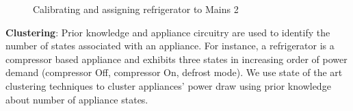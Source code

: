 \documentclass[conference]{IEEEtran}
\begin{document}
\begin{figure} 
	
     \hspace{2pt}
    \vspace{-8pt}
  	\caption{Calibrating and assigning refrigerator to Mains 2 }
  	\vspace{-20pt}
    \label{fig:assignment}
\end{figure}

\noindent\textbf{Clustering}: Prior knowledge and appliance circuitry\cite{ting2005} are used to identify the number of states associated with an appliance. For instance, a refrigerator is a compressor based appliance and exhibits three states in increasing order of power demand (compressor Off, compressor On, defrost mode). We use state of the art clustering techniques to cluster appliances' power draw using prior knowledge about number of appliance states.
\end{document}
